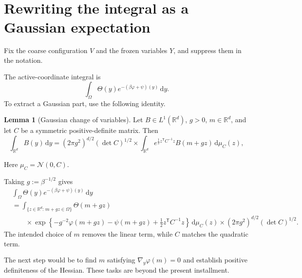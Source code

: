 \documentclass[10pt,reqno]{amsart}
\theoremstyle{definition}
\newtheorem{lemma}[definition]{Lemma}
\theoremstyle{remark}
\numberwithin{equation}{section}
\numberwithin{figure}{section}
\newcommand{\dd}{\mathrm d}
\newcommand{\R}{\mathbb R}
\begin{document}
\section{Rewriting the integral as a Gaussian expectation}
Fix the coarse configuration $V$ and the frozen variables $Y$, and suppress them in the notation.

The active-coordinate integral is
\begin{equation}\label{eq:display-099}
\int_{\Omega}\Theta(y)e^{-(\beta\varphi+\psi)(y)}\,\dd y.
\end{equation}
To extract a Gaussian part, use the following identity.

\begin{lemma}[Gaussian change of variables]\label{lem:gaussian-change}
Let $B\in L^1(\R^d)$, $g>0$, $m\in\R^d$, and let $C$ be a symmetric positive-definite matrix. Then
\begin{equation}\label{eq:gaussian-identity}
\int_{\R^d}B(y)\,\dd y
=(2\pi g^2)^{d/2}(\det C)^{1/2} \times\int_{\R^d}
 e^{\frac12z^{\mathsf T}C^{-1}z}B(m+gz)\,\dd\mu_C(z),
\end{equation}

Here $\mu_C=\mathcal N(0,C)$.

\end{lemma}

Taking $g:=\beta^{-1/2}$ gives
\begin{equation}\label{eq:display-101}
\begin{aligned}
&\int_{\Omega}\Theta(y)e^{-(\beta\varphi+\psi)(y)}\,\dd y\\
&=\int_{\{z\in\R^d:\,m+gz\in\Omega\}}\Theta(m+gz)\\
&\qquad\times\exp\left\{-g^{-2}\varphi(m+gz)-\psi(m+gz)
+\frac12z^{\mathsf T}C^{-1}z\right\}\,\dd\mu_C(z)
\times(2\pi g^2)^{d/2}(\det C)^{1/2}.
\end{aligned}
\end{equation}
The intended choice of $m$ removes the linear term, while $C$ matches the quadratic term.

The next step would be to find $m$ satisfying $\nabla_y\varphi(m)=0$ and establish positive definiteness of the Hessian. These tasks are beyond the present installment.

\appendix
\end{document}
